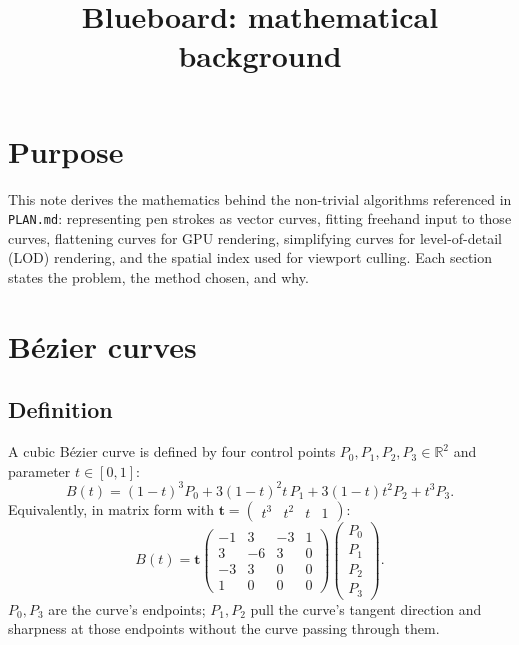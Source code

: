 \documentclass[11pt]{article}
\title{Blueboard: mathematical background}
\author{}
\date{}
\begin{document}
\maketitle

\section*{Purpose}
This note derives the mathematics behind the non-trivial algorithms referenced in
\texttt{PLAN.md}: representing pen strokes as vector curves, fitting freehand input to
those curves, flattening curves for GPU rendering, simplifying curves for level-of-detail
(LOD) rendering, and the spatial index used for viewport culling. Each section states the
problem, the method chosen, and why.

\section{Bézier curves}

\subsection{Definition}
A cubic Bézier curve is defined by four control points
$P_0, P_1, P_2, P_3 \in \mathbb{R}^2$ and parameter $t \in [0,1]$:
\begin{equation}
  B(t) = (1-t)^3 P_0 + 3(1-t)^2 t\, P_1 + 3(1-t) t^2 P_2 + t^3 P_3.
\end{equation}
Equivalently, in matrix form with $\mathbf{t} = \begin{pmatrix}t^3 & t^2 & t & 1\end{pmatrix}$:
\begin{equation}
  B(t) = \mathbf{t}
  \begin{pmatrix}
    -1 & 3 & -3 & 1 \\
     3 & -6 & 3 & 0 \\
    -3 & 3 & 0 & 0 \\
     1 & 0 & 0 & 0
  \end{pmatrix}
  \begin{pmatrix} P_0 \\ P_1 \\ P_2 \\ P_3 \end{pmatrix}.
\end{equation}
$P_0, P_3$ are the curve's endpoints; $P_1, P_2$ pull the curve's tangent direction and
sharpness at those endpoints without the curve passing through them.
\end{document}
